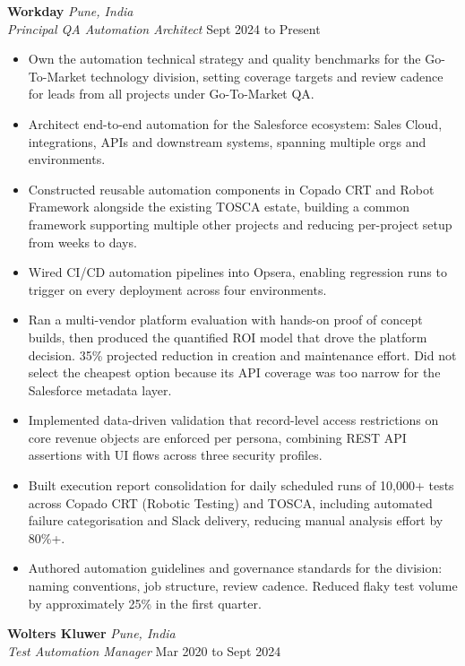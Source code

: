 \documentclass[11pt, a4paper]{article}
\newcommand{\roleheader}[4]{%
    \noindent\textbf{#1} \hfill \textit{#2}\\
    \textit{#3} \hfill #4\par\vspace{2pt}
}
\begin{document}
\roleheader{Workday}{Pune, India}{Principal QA Automation Architect}{Sept 2024 to Present}

\begin{itemize}
    \item Own the automation technical strategy and quality benchmarks for the Go-To-Market technology division, setting coverage targets and review cadence for leads from all projects under Go-To-Market QA.
    \item Architect end-to-end automation for the Salesforce ecosystem: Sales Cloud, integrations, APIs and downstream systems, spanning multiple orgs and environments.
    \item Constructed reusable automation components in Copado CRT and Robot Framework alongside the existing TOSCA estate, building a common framework supporting multiple other projects and reducing per-project setup from weeks to days.
    \item Wired CI/CD automation pipelines into Opsera, enabling regression runs to trigger on every deployment across four environments.
    \item Ran a multi-vendor platform evaluation with hands-on proof of concept builds, then produced the quantified ROI model that drove the platform decision. 35\% projected reduction in creation and maintenance effort. Did not select the cheapest option because its API coverage was too narrow for the Salesforce metadata layer.
    \item Implemented data-driven validation that record-level access restrictions on core revenue objects are enforced per persona, combining REST API assertions with UI flows across three security profiles.
    \item Built execution report consolidation for daily scheduled runs of 10,000+ tests across Copado CRT (Robotic Testing) and TOSCA, including automated failure categorisation and Slack delivery, reducing manual analysis effort by 80\%+.
    \item Authored automation guidelines and governance standards for the division: naming conventions, job structure, review cadence. Reduced flaky test volume by approximately 25\% in the first quarter.
\end{itemize}

\roleheader{Wolters Kluwer}{Pune, India}{Test Automation Manager}{Mar 2020 to Sept 2024}
\end{document}
